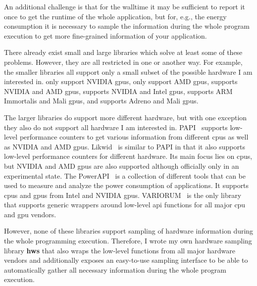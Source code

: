 An additional challenge is that for the walltime it may be sufficient to report it once to get the runtime of the whole application, but for, e.g., the energy consumption it is necessary to sample the information during the whole program execution to get more fine-grained information of your application. 

There already exist small and large libraries which solve at least some of these problems. 
However, they are all restricted in one or another way.
For example, the smaller libraries all support only a small subset of the possible hardware I am interested in. 
\cite{araf_verified_2020, leinardi_greenwithenvy_2024, noauthor_gpu_2024, guerreiro_gpgpu_2018} only support NVIDIA \glspl{gpu}, \cite{amd_amd_2024, noauthor_gpu_2023} only support AMD \glspl{gpu}, \cite{noauthor_ricks-lab_2024} supports NVIDIA and AMD \glspl{gpu}, \cite{benoit_courty_mlco2codecarbon_2024} supports NVIDIA and Intel \glspl{gpu}, \cite{noauthor_libgpucounters_2024} supports ARM Immortalis and Mali \glspl{gpu}, and \cite{google_hardwareperfcounter_2022} supports Adreno and Mali \glspl{gpu}.

The larger libraries do support more different hardware, but with one exception they also do not support all hardware I am interested in. 
PAPI~\cite{mucci_papi_1999} supports low-level performance counters to get various information from different \glspl{cpu} as well as NVIDIA and AMD \glspl{gpu}. 
Likwid~\cite{thomas_gruber_likwid_2023} is similar to PAPI in that it also supports low-level performance counters for different hardware. 
Its main focus lies on \glspl{cpu}, but NVIDIA and AMD \glspl{gpu} are also supported although officially only in an experimental state. 
The PowerAPI~\cite{fieni_powerapi_2024} is a collection of different tools that can be used to measure and analyze the power consumption of applications. 
It supports \glspl{cpu} and \glspl{gpu} from Intel and NVIDIA \glspl{gpu}. 
VARIORUM~\cite{noauthor_variorum_2024} is the only library that supports generic wrappers around low-level \gls{api} functions for all major \gls{cpu} and \gls{gpu} vendors. 

However, none of these libraries support sampling of hardware information during the whole programming execution. 
Therefore, I wrote my own hardware sampling library \textbf{hws} that also wraps the low-level functions from all major hardware vendors and additionally exposes an easy-to-use sampling interface to be able to automatically gather all necessary information during the whole program execution. 



